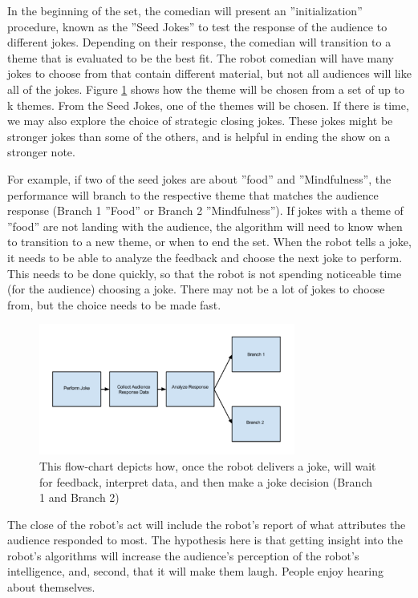 \documentclass[onecolumn, draftclsnofoot,10pt, compsoc]{IEEEtran}
\begin{document}
In the beginning of the set, the comedian will present an ”initialization” procedure, known
as the ”Seed Jokes” to test the response of the audience to different jokes. Depending on their response, the comedian
will transition to a theme that is evaluated to be the best fit. The robot comedian will have many jokes to choose from
that contain different material, but not all audiences will like all of the jokes. Figure \ref{fig:process} shows how the theme will be
chosen from a set of up to k themes. From the Seed Jokes, one of the themes will be chosen. If there is time, we may also
explore the choice of strategic closing jokes. These jokes might be stronger jokes than some of the others, and is helpful
in ending the show on a stronger note.

For example, if two of the seed jokes are about ”food” and ”Mindfulness”, the performance will branch to the
respective theme that matches the audience response (Branch 1 ”Food” or Branch 2 ”Mindfulness”). If jokes with a
theme of ”food” are not landing with the audience, the algorithm will need to know when to transition to a new theme, or when to end the set. When the robot tells a joke, it needs to be able to analyze the feedback and choose the next joke
to perform. This needs to be done quickly, so that the robot is not spending noticeable time (for the audience) choosing
a joke. There may not be a lot of jokes to choose from, but the choice needs to be made fast.

\begin{figure}[H]
  \centering
  \includegraphics[width=0.75\textwidth,height=0.75\textheight,keepaspectratio]{fig1}
  \caption{ This flow-chart depicts how, once the robot delivers a joke, will wait for feedback, interpret data, and then make a joke decision (Branch 1 and Branch 2)}
  \label{fig:process}
\end{figure}

The close of the robot’s act will include the robot’s report of what attributes the audience
responded to most. The hypothesis here is that getting insight into the robot’s algorithms will increase the audience’s
perception of the robot’s intelligence, and, second, that it will make them laugh. People enjoy hearing about themselves.
\end{document}
